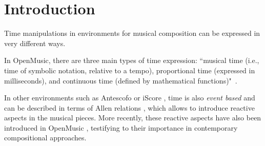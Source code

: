 \documentclass{article}
\title{\papertitle}
\begin{document}
%
\capstartfalse
\maketitle
\capstarttrue
%
\begin{abstract}
INScore is an environment for augmented interactive music score design,
oriented towards unconventional uses of music notation, without excluding conventional approaches. In this environment, although all the objects of a score have a temporal dimension, the time remains \emph{fixed} i.e., the date (or duration) of an object does not change, except
when a message is received (sent from an external application or resulting from events handling). Thus, INScore does not include a time manager in the classic sense of the term.
This choice was based on the fact that the system was originally designed 
to be used with sound production software (e.g., Max/MSP, Pure Data), that have more strict real-time constraints than INScore's graphical environment.
However, the need to introduce dynamic time has gradually emerged, leading to an original model, both \emph{continuous} and  \emph{event based}. The paper presents this model and its properties %
in the frame on INScore.
\end{abstract}
%


\section{Introduction}\label{sec:introduction}
Time manipulations in environments for musical composition can be expressed in very different ways.

In OpenMusic, there are three main types of time expression: ``musical time (i.e., time of symbolic notation, relative to a tempo), proportional time (expressed in milliseconds), and continuous time (defined by mathematical functions)"~\cite{bresson08}.

In other environments such as Antescofo \cite{acont08} or iScore \cite{AllombertDA08}, time is also \textit{event based} and can be described in terms of Allen relations \cite{Allen:1983:MKT:182.358434}, which allows to introduce reactive aspects in the musical pieces.
More recently, these reactive aspects have also been introduced in OpenMusic \cite{bresson:hal-00965747}, testifying to their importance in contemporary compositional approaches.
\end{document}
